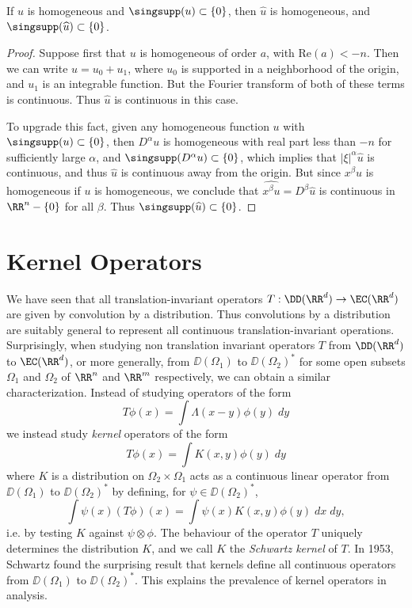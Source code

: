 \begin{lemma}
    If $u$ is homogeneous and $\singsupp(u) \subset \{ 0 \}$, then $\widehat{u}$ is homogeneous, and $\singsupp(\widehat{u}) \subset \{ 0 \}$.
\end{lemma}
\begin{proof}
    Suppose first that $u$ is homogeneous of order $a$, with $\text{Re}(a) < -n$. Then we can write $u = u_0 + u_1$, where $u_0$ is supported in a neighborhood of the origin, and $u_1$ is an integrable function. But the Fourier transform of both of these terms is continuous. Thus $\widehat{u}$ is continuous in this case.

    To upgrade this fact, given any homogeneous function $u$ with $\singsupp(u) \subset \{ 0 \}$, then $D^\alpha u$ is homogeneous with real part less than $-n$ for sufficiently large $\alpha$, and $\singsupp(D^\alpha u) \subset \{ 0 \}$, which implies that $|\xi|^\alpha \widehat{u}$ is continuous, and thus $\widehat{u}$ is continuous away from the origin. But since $x^\beta u$ is homogeneous if $u$ is homogeneous, we conclude that $\widehat{x^\beta u} = D^\beta \widehat{u}$ is continuous in $\RR^n - \{ 0 \}$ for all $\beta$. Thus $\singsupp(\widehat{u}) \subset \{ 0 \}$.
\end{proof}


\section{Kernel Operators}

We have seen that all translation-invariant operators $T: \DD(\RR^d) \to \EC(\RR^d)$ are given by convolution by a distribution. Thus convolutions by a distribution are suitably general to represent all continuous translation-invariant operations. Surprisingly, when studying non translation invariant operators $T$ from $\DD(\RR^d)$ to $\EC(\RR^d)$, or more generally, from $\DD(\Omega_1)$ to $\DD(\Omega_2)^*$ for some open subsets $\Omega_1$ and $\Omega_2$ of $\RR^n$ and $\RR^m$ respectively, we can obtain a similar characterization. Instead of studying operators of the form
%
\[ T\phi(x) = \int \Lambda(x - y) \phi(y)\; dy \]
%
we instead study \emph{kernel} operators of the form
%
\[ T\phi(x) = \int K(x,y) \phi(y)\; dy \]
%
where $K$ is a distribution on $\Omega_2 \times \Omega_1$ acts as a continuous linear operator from $\DD(\Omega_1)$ to $\DD(\Omega_2)^*$ by defining, for $\psi \in \DD(\Omega_2)^*$,
%
\[ \int \psi(x) (T\phi)(x) = \int \psi(x) K(x,y) \phi(y)\; dx\; dy, \]
%
i.e. by testing $K$ against $\psi \otimes \phi$. The behaviour of the operator $T$ uniquely determines the distribution $K$, and we call $K$ the \emph{Schwartz kernel} of $T$. In 1953, Schwartz found the surprising result that kernels define all continuous operators from $\DD(\Omega_1)$ to $\DD(\Omega_2)^*$. This explains the prevalence of kernel operators in analysis.

